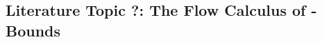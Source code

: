 \subsection{Literature Topic ?: The Flow Calculus of \mwp-Bounds}
\label{subsec:mwp}

~\cite{jones2009}

